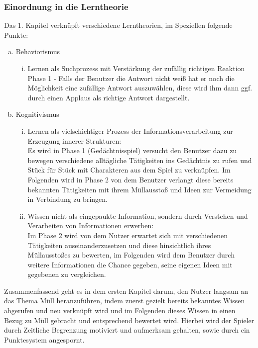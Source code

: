 \documentclass[a4paper]{article}
\begin{document}
        \subsubsection{Einordnung in die Lerntheorie}
            Das 1. Kapitel verknüpft verschiedene Lerntheorien, im Speziellen folgende Punkte:
            \begin{enumerate}[(a)]
                \item Behaviorismus
                \begin{enumerate}[(i)]
                    \item Lernen als Suchprozess mit Verstärkung der zufällig richtigen Reaktion\\
                    Phase 1 - Falls der Benutzer die Antwort nicht weiß hat er noch die Möglichkeit eine zufällige Antwort auszuwählen, diese wird ihm dann ggf. durch einen Applaus als richtige Antwort dargestellt.
                \end{enumerate}

                \item Kognitivismus
                \begin{enumerate}[(i)]
                    \item Lernen als vielschichtiger Prozess der Informationsverarbeitung zur Erzeugung innerer Strukturen:\\
                    Es wird in Phase 1 (Gedächtnisspiel) versucht den Benutzer dazu zu bewegen verschiedene alltägliche Tätigkeiten ins Gedächtnis zu rufen und Stück für Stück mit Charakteren aus dem Spiel zu verknüpfen. Im Folgenden wird in Phase 2 von dem Benutzer verlangt diese bereits bekannten Tätigkeiten mit ihrem Müllausstoß und Ideen zur Vermeidung in Verbindung zu bringen.\\

                    \item Wissen nicht als eingepaukte Information, sondern durch Verstehen und Verarbeiten von Informationen erwerben:\\
                    Im Phase 2 wird von dem Nutzer erwartet sich mit verschiedenen Tätigkeiten auseinanderzusetzen und diese hinsichtlich ihres Müllausstoßes zu bewerten, im Folgenden wird dem Benutzer durch weitere Informationen die Chance gegeben, seine eigenen Ideen mit gegebenen zu vergleichen.\\
                \end{enumerate}
            \end{enumerate}
            Zusammenfassend geht es in dem ersten Kapitel darum, den Nutzer langsam an das Thema Müll heranzuführen, indem zuerst gezielt bereits bekanntes Wissen abgerufen und neu verknüpft wird und im Folgenden dieses Wissen in einen Bezug zu Müll gebracht und entsprechend bewertet wird. Hierbei wird der Spieler durch Zeitliche Begrenzung motiviert und aufmerksam gehalten, sowie durch ein Punktesystem angespornt.
\end{document}
